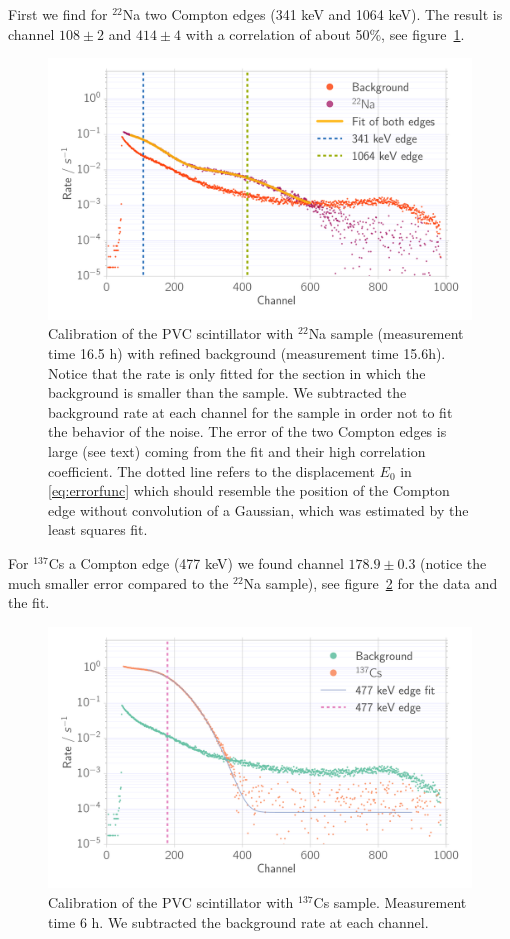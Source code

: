 First we find for $^{22}$Na two Compton edges (341 keV and
1064 keV). The result is
channel $108 \pm 2$ and $414 \pm 4$ with a correlation of about 50\%, see
figure~\ref{fig:calib_ps_na}.

\begin{figure}[htpb]
    \centering
    \includegraphics[width=0.9\linewidth]{./analysis/figures/calib_ps_na}
    \caption{Calibration of the PVC scintillator with
        $^{22}$Na sample (measurement time
    16.5 h) with refined background (measurement time 15.6h).
    Notice that the rate is 
    only fitted for the section in which the background is
    smaller than the sample. We
    subtracted the background rate at each channel
    for the sample in order not to fit the 
    behavior of the noise. The error of the two
    Compton edges is large (see text) coming
    from the fit and their high correlation coefficient. The 
dotted line refers to the displacement $E_0$ in \eqref{eq:errorfunc} which should resemble the position of the Compton
edge without convolution of a Gaussian, which was estimated
by the least squares fit.}
\label{fig:calib_ps_na}
\end{figure}
For $^{137}$Cs a Compton edge (477 keV)
we found channel $178.9 \pm 0.3$ 
(notice the much smaller error compared to the $^{22}$Na sample), 
see figure~\ref{fig:calib_ps_cs} for the data and the fit.
\begin{figure}[htpb]
    \centering
    \includegraphics[width=0.9\linewidth]{./analysis/figures/calib_ps_cs}
    \caption{Calibration of the PVC scintillator with $^{137}$Cs sample. Measurement time
    6 h. We subtracted the background rate at each channel. }
\label{fig:calib_ps_cs}
\end{figure}


